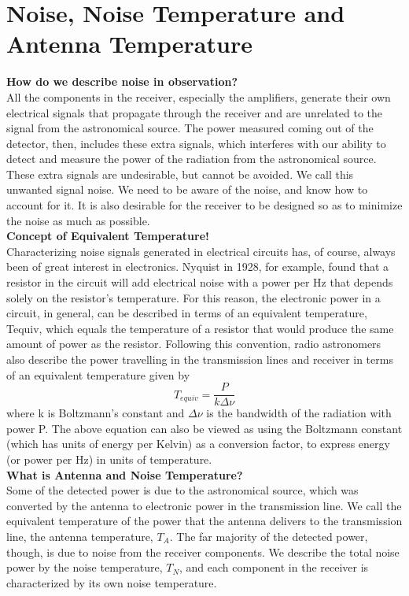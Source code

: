 \documentclass[10pt]{report}
\begin{document}
\section{Noise, Noise Temperature and Antenna Temperature}

\textbf{How do we describe noise in observation?}\\
All the components in the receiver, especially the amplifiers, generate their own electrical signals that propagate through the receiver and are unrelated to the signal from the astronomical source. The power measured coming out of the detector, then, includes these extra signals, which interferes with our ability to detect and measure the power of the radiation from the astronomical source.  These extra signals are undesirable, but cannot be avoided.  We call this unwanted signal noise.  We need to be aware of the noise, and know how to account for it.  It is also desirable for the receiver to be designed so as to minimize the noise as much as possible.\\  
 \textbf{Concept of Equivalent Temperature!}\\
Characterizing noise signals generated in electrical circuits has, of course, always been of great interest in electronics.  Nyquist in 1928, for example, found that a resistor in the circuit will add electrical noise with a power per Hz that depends solely on the resistor's temperature.  For this reason, the electronic power in a circuit, in general, can be described in terms of an equivalent temperature, Tequiv, which equals the temperature of a resistor that would produce the same amount of power as the resistor.  Following this convention, radio astronomers also describe the power travelling in the transmission lines and receiver in terms of an equivalent temperature given by
\begin{equation}
T_{equiv}=\frac{P}{k \Delta\nu}
\end{equation}
where k is Boltzmann's constant and $\Delta \nu$ is the bandwidth of the radiation with power P. The above equation can also be viewed as using the Boltzmann constant (which has units of energy per Kelvin) as a conversion factor, to express energy (or power per Hz) in units of temperature. \\
\textbf{What is Antenna and Noise Temperature?}\\
Some of the detected power is due to the astronomical source, which was converted by the antenna to electronic power in the transmission line.  We call the equivalent temperature of the power that the antenna delivers to the transmission line, the antenna temperature, $T_A$. The far majority of the detected power, though, is due to noise from the receiver components.  We describe the total noise power by the noise temperature, $T_N$, and each component in the receiver is characterized by its own noise temperature. \\
\end{document}
